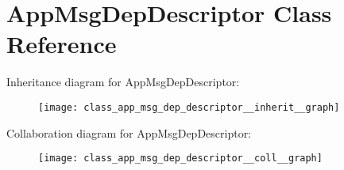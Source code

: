 \hypertarget{class_app_msg_dep_descriptor}{}\section{App\+Msg\+Dep\+Descriptor Class Reference}
\label{class_app_msg_dep_descriptor}


Inheritance diagram for App\+Msg\+Dep\+Descriptor\+:\nopagebreak
\begin{figure}[H]
\begin{center}
\leavevmode
\texttt{[image: class\_app\_msg\_dep\_descriptor\_\_inherit\_\_graph]}
\end{center}
\end{figure}


Collaboration diagram for App\+Msg\+Dep\+Descriptor\+:\nopagebreak
\begin{figure}[H]
\begin{center}
\leavevmode
\texttt{[image: class\_app\_msg\_dep\_descriptor\_\_coll\_\_graph]}
\end{center}
\end{figure}
